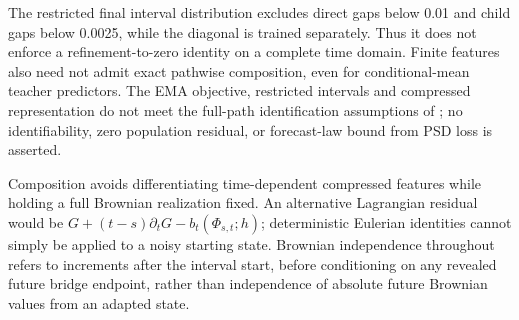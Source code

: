 The restricted final interval distribution excludes direct gaps below 0.01 and child gaps below 0.0025, while the diagonal is trained separately. Thus it does not enforce a refinement-to-zero identity on a complete time domain. Finite features also need not admit exact pathwise composition, even for conditional-mean teacher predictors. The EMA objective, restricted intervals and compressed representation do not meet the full-path identification assumptions of \citet{pan2026itomaps}; no identifiability, zero population residual, or forecast-law bound from PSD loss is asserted.

Composition avoids differentiating time-dependent compressed features while holding a full Brownian realization fixed. An alternative Lagrangian residual would be $G+(t-s)\partial_tG-b_t(\Phi_{s,t};h)$; deterministic Eulerian identities cannot simply be applied to a noisy starting state. Brownian independence throughout refers to increments after the interval start, before conditioning on any revealed future bridge endpoint, rather than independence of absolute future Brownian values from an adapted state.
